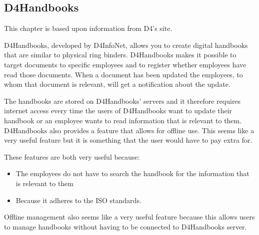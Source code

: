\subsection{D4Handbooks}
This chapter is based upon information from D4's site\cite{D4Hanbook}.

D4Handbooks, developed by D4InfoNet, allows you to create digital handbooks that are similar to physical ring binders.
D4Handbooks makes it possible to target documents to specific employees and to register whether employees have read those documents.
When a document has been updated the employees, to whom that document is relevant, will get a notification about the update.

The handbooks are stored on D4Handbooks' servers and it therefore requires internet access every time the users of D4Handbooks want to update their handbook or an employee wants to read information that is relevant to them.
D4Handbooks also provides a feature that allows for offline use. This seems like a very useful feature but it is something that the user would have to pay extra for.

These features are both very useful because:

\begin{itemize}
        \item The employees do not have to search the handbook for the information that is relevant to them
        \item Because it adheres to the ISO standards.
\end{itemize}

Offline management also seems like a very useful feature because this allows users to manage handbooks without having to be connected to D4Handbooks server.
